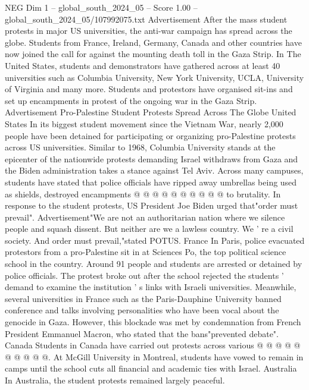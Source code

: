 \begin{textsample}{NEG Dim 1 – global\_south\_2024\_05 – Score 1.00 – global\_south\_2024\_05/107992075.txt}  \label{ex:f1_neg_371}
Advertisement After the mass student protests in major US universities, the anti-war campaign has spread across the globe.
Students from France, Ireland, Germany, Canada and other countries have now joined the call for against the mounting death toll in the Gaza Strip.
In The United States, students and demonstrators have gathered across at least 40 universities such as Columbia University, New York University, UCLA, University of Virginia and many more.
Students and protestors have organised sit-ins and set up encampments in protest of the ongoing war in the Gaza Strip.
Advertisement Pro-Palestine Student Protests Spread Across The Globe United States In its biggest student movement since the Vietnam War, nearly 2,000 people have been detained for participating or organizing pro-Palestine protests across US universities.
Similar to 1968, Columbia University stands at the epicenter of the nationwide protests demanding Israel withdraws from Gaza and the Biden administration takes a stance against Tel Aviv.
Across many campuses, students have stated that police officials have ripped away umbrellas being used as shields, destroyed encampments @ @ @ @ @ @ @ @ @ @ to brutality.
In response to the student protests, US President Joe Biden urged that"order must prevail".
Advertisement"We are not an authoritarian nation where we silence people and squash dissent.
But neither are we a lawless country.
We ' re a civil society.
And order must prevail,"stated POTUS.
France In Paris, police evacuated protestors from a pro-Palestine sit in at Sciences Po, the top political science school in the country.
Around 91 people and students are arrested or detained by police officials.
The protest broke out after the school rejected the students ' demand to examine the institution ' s links with Israeli universities.
Meanwhile, several universities in France such as the Paris-Dauphine University banned conference and talks involving personalities who have been vocal about the genocide in Gaza.
However, this blockade was met by condemnation from French President Emmanuel Macron, who stated that the bans"prevented debate".
Canada Students in Canada have carried out protests across various @ @ @ @ @ @ @ @ @ @.
At McGill University in Montreal, students have vowed to remain in camps until the school cuts all financial and academic ties with Israel.
Australia In Australia, the student protests remained largely peaceful.

\end{textsample}

